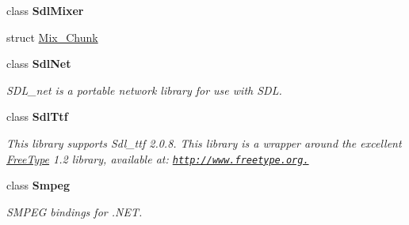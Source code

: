 \begin{DoxyCompactItemize}
class {\bfseries SdlMixer}
\item 
struct \hyperlink{struct_tao_1_1_sdl_1_1_mix___chunk}{Mix\_\-Chunk}
\item 
class {\bfseries SdlNet}
\begin{DoxyCompactList}\small\item\em SDL\_\-net is a portable network library for use with SDL. \item\end{DoxyCompactList}\item 
class {\bfseries SdlTtf}
\begin{DoxyCompactList}\small\item\em This library supports Sdl\_\-ttf 2.0.8. This library is a wrapper around the excellent \hyperlink{namespace_tao_1_1_free_type}{FreeType} 1.2 library, available at: \href{http://www.freetype.org.}{\tt http://www.freetype.org.} \item\end{DoxyCompactList}\item 
class {\bfseries Smpeg}
\begin{DoxyCompactList}\small\item\em SMPEG bindings for .NET. \item\end{DoxyCompactList}\end{DoxyCompactItemize}

